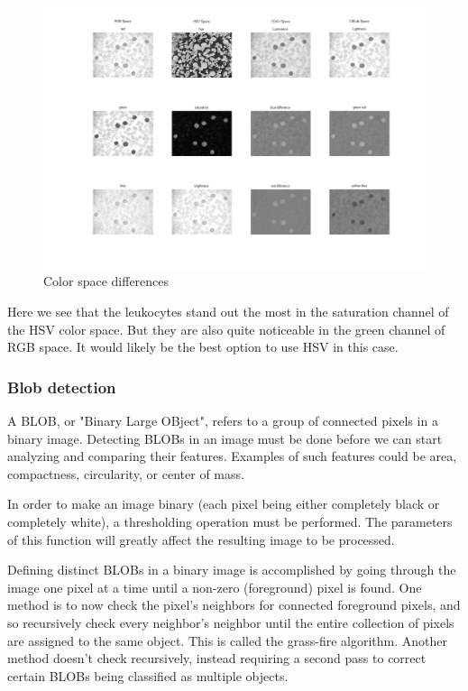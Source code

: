 					\begin{figure}[H]
				\centering
				\includegraphics[width=\linewidth]{figure/Analysis/differences.jpg}
				\caption{Color space differences}
				\label{fig:differences}
			\end{figure}
		Here we see that the leukocytes stand out the most in the saturation channel of the HSV color space. But they are also quite noticeable in the green channel of RGB space. It would likely be the best option to use HSV in this case. 
	
			\subsubsection{Blob detection}
			
			A BLOB, or "Binary Large OBject", refers to a group of connected pixels in a binary image. Detecting BLOBs in an image must be done before we can start analyzing and comparing their features. Examples of such features could be area, compactness, circularity, or center of mass.
			
			In order to make an image binary (each pixel being either completely black or completely white), a thresholding operation must be performed. The parameters of this function will greatly affect the resulting image to be processed. 
			
			Defining distinct BLOBs in a binary image is accomplished by going through the image one pixel at a time until a non-zero (foreground) pixel is found. One method is to now check the pixel's neighbors for connected foreground pixels, and so recursively check every neighbor's neighbor until the entire collection of pixels are assigned to the same object. This is called the grass-fire algorithm. Another method doesn't check recursively, instead requiring a second pass to correct certain BLOBs being classified as multiple objects.
			
